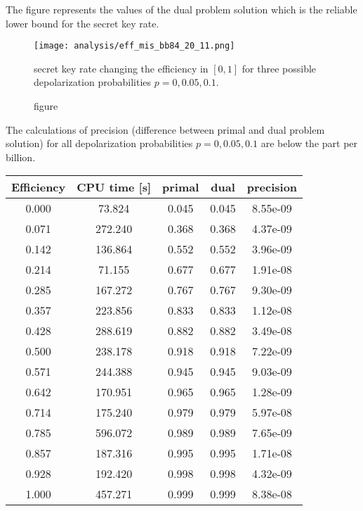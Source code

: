\documentclass{article}
\begin{document}
 The figure represents the values of the dual problem solution which is the reliable lower bound for the secret key rate.
 \begin{figure}[h!]
    \centering
    \texttt{[image: analysis/eff\_mis\_bb84\_20\_11.png]}
    \caption{figure}{secret key rate changing the efficiency in \([0,1]\) for three possible depolarization probabilities \(p=0,0.05,0.1\).}
\end{figure}
The calculations of precision (difference between primal and dual problem solution) for all depolarization probabilities \(p=0,0.05,0.1\) are below the part per billion.
 \\
 \begin{minipage}{0.5\linewidth}
    \centering
    \begin{tabular}{c|c|c|c|c}
        Efficiency & CPU time [s]& primal& dual& precision\\
        \hline
        0.000 & 73.824  & 0.045 & 0.045 & 8.55e-09 \\
        0.071 & 272.240 & 0.368 & 0.368 & 4.37e-09 \\
        0.142 & 136.864 & 0.552 & 0.552 & 3.96e-09 \\
        0.214 & 71.155  & 0.677 & 0.677 & 1.91e-08 \\
        0.285 & 167.272 & 0.767 & 0.767 & 9.30e-09 \\
        0.357 & 223.856 & 0.833 & 0.833 & 1.12e-08 \\
        0.428 & 288.619 & 0.882 & 0.882 & 3.49e-08 \\
        0.500 & 238.178 & 0.918 & 0.918 & 7.22e-09 \\
        0.571 & 244.388 & 0.945 & 0.945 & 9.03e-09 \\
        0.642 & 170.951 & 0.965 & 0.965 & 1.28e-09 \\
        0.714 & 175.240 & 0.979 & 0.979 & 5.97e-08 \\
        0.785 & 596.072 & 0.989 & 0.989 & 7.65e-09 \\
        0.857 & 187.316 & 0.995 & 0.995 & 1.71e-08 \\
        0.928 & 192.420 & 0.998 & 0.998 & 4.32e-09 \\
        1.000 & 457.271 & 0.999 & 0.999 & 8.38e-08 \\
        \hline
    \end{tabular}
    \label{tbl:p-0}
\end{minipage}
\end{document}
